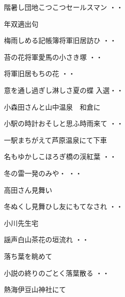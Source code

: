 \begin{shiika}階暑し団地こつこつセールスマン
\hfill{・・}\end{shiika}
\vspace{0.6cm}
年双適出句
\begin{shiika}梅雨しめる記帳簿将軍旧居訪ひ
\hfill{・・}\end{shiika}
\begin{shiika}苔の花将軍愛馬の小さき塚
\hfill{・・}\end{shiika}
\begin{shiika}将軍旧居もちの花
\hfill{・・}\end{shiika}
\begin{shiika}意を通し過ぎし淋しさ夏の蝶
\hfill{入選・・}\end{shiika}
\vspace{0.6cm}
小森田さんと山中温泉　和倉に
\begin{shiika}小駅の時計おそしと思ふ時雨来て
\hfill{・・}\end{shiika}
\vspace{0.6cm}
一駅まちがえて芦原温泉にて下車
\begin{shiika}名もゆかしこほろぎ橋の渓紅葉
\hfill{・・}\end{shiika}
\vspace{0.6cm}
\begin{shiika}冬の雷一発のみや・
\hfill{・・}\end{shiika}
\vspace{0.6cm}
高田さん見舞い
\begin{shiika}冬ぬくし見舞ひし友にもてなされ
\hfill{・・}\end{shiika}
\vspace{0.6cm}小川先生宅
\begin{shiika}謡声白山茶花の垣流れ
\hfill{・・}\end{shiika}
\vspace{0.6cm}
落ち葉を眺めて
\begin{shiika}小説の終りのごとく落葉散る
\hfill{・・}\end{shiika}
\vspace{0.6cm}
熱海伊豆山神社にて
